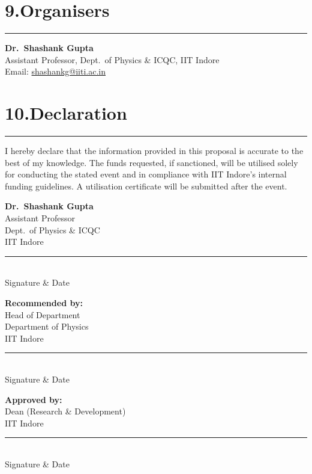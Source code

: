 \documentclass[12pt,a4paper]{article}
\begin{document}
\section*{9.\quad Organisers}
\vspace{-4pt}\hrule\vspace{6pt}

\noindent\textbf{Dr.\ Shashank Gupta}\\
Assistant Professor, Dept.\ of Physics \& ICQC, IIT Indore\\
Email: \href{mailto:shashankg@iiti.ac.in}{shashankg@iiti.ac.in}

\section*{10.\quad Declaration}
\vspace{-4pt}\hrule\vspace{6pt}

I hereby declare that the information provided in this proposal is accurate to the best of my knowledge. The funds requested, if sanctioned, will be utilised solely for conducting the stated event and in compliance with IIT Indore's internal funding guidelines. A utilisation certificate will be submitted after the event.

\vspace{2cm}

\begin{minipage}{0.45\textwidth}
  \textbf{Dr.\ Shashank Gupta}\\
  Assistant Professor\\
  Dept.\ of Physics \& ICQC\\
  IIT Indore\\
  \vspace{1.5cm}
  \rule{6cm}{0.5pt}\\
  {\small Signature \& Date}
\end{minipage}
\hfill
\begin{minipage}{0.45\textwidth}
  \textbf{Recommended by:}\\
  Head of Department\\
  Department of Physics\\
  IIT Indore\\
  \vspace{1.5cm}
  \rule{6cm}{0.5pt}\\
  {\small Signature \& Date}
\end{minipage}

\vspace{1.5cm}

\begin{center}
\begin{minipage}{0.45\textwidth}
  \centering
  \textbf{Approved by:}\\
  Dean (Research \& Development)\\
  IIT Indore\\
  \vspace{1.5cm}
  \rule{6cm}{0.5pt}\\
  {\small Signature \& Date}
\end{minipage}
\end{center}
\end{document}
